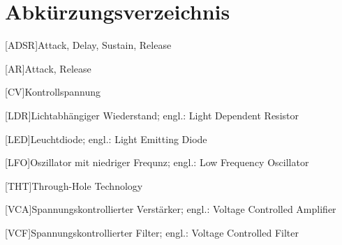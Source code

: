 
\chapter{Abkürzungsverzeichnis}

\begin{acronym}
[ADSR]{Attack, Delay, Sustain, Release}
\end{acronym}

\begin{acronym}
[AR]{Attack, Release}
\end{acronym}

\begin{acronym}
[CV]{Kontrollspannung}
\end{acronym}

\begin{acronym}
[LDR]{Lichtabhängiger Wiederstand; engl.: Light Dependent Resistor}
\end{acronym}

\begin{acronym}
[LED]{Leuchtdiode; engl.: Light Emitting Diode}
\end{acronym}

\begin{acronym}
[LFO]{Oszillator mit niedriger Frequnz; engl.: Low Frequency Oscillator}
\end{acronym}

\begin{acronym}
[THT]{Through-Hole Technology}
\end{acronym}

\begin{acronym}
[VCA]{Spannungskontrollierter Verstärker; engl.: Voltage Controlled Amplifier}
\end{acronym}

\begin{acronym}
[VCF]{Spannungskontrollierter Filter; engl.: Voltage Controlled Filter}
\end{acronym}
